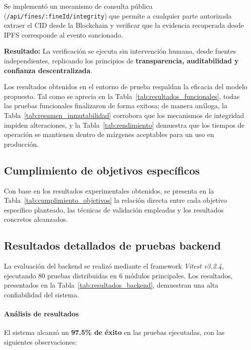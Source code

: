 Se implementó un mecanismo de consulta pública (\texttt{/api/fines/:fineId/integrity}) que permite a cualquier parte autorizada extraer el CID desde la Blockchain y verificar que la evidencia recuperada desde IPFS corresponde al evento sancionado.

\textbf{Resultado:} La verificación se ejecuta sin intervención humana, desde fuentes independientes, replicando los principios de \textbf{transparencia, auditabilidad y confianza descentralizada}.




Los resultados obtenidos en el entorno de prueba respaldan la eficacia del modelo propuesto. Tal como se aprecia en la Tabla~\ref{tab:resultados_funcionales}, todas las pruebas funcionales finalizaron de forma exitosa; de manera análoga, la Tabla~\ref{tab:resumen_inmutabilidad} corrobora que los mecanismos de integridad impiden alteraciones, y la Tabla~\ref{tab:rendimiento} demuestra que los tiempos de operación se mantienen dentro de márgenes aceptables para un uso en producción.

\subsection{Cumplimiento de objetivos específicos}

Con base en los resultados experimentales obtenidos, se presenta en la Tabla~\ref{tab:cumplimiento_objetivos} la relación directa entre cada objetivo específico planteado, las técnicas de validación empleadas y los resultados concretos alcanzados.



\subsection{Resultados detallados de pruebas backend}

La evaluación del backend se realizó mediante el framework \textit{Vitest v3.2.4}, ejecutando 80 pruebas distribuidas en 6 módulos principales. Los resultados, presentados en la Tabla~\ref{tab:resultados_backend}, demuestran una alta confiabilidad del sistema.



\paragraph{Análisis de resultados}
El sistema alcanzó un \textbf{97.5\% de éxito} en las pruebas ejecutadas, con las siguientes observaciones:

